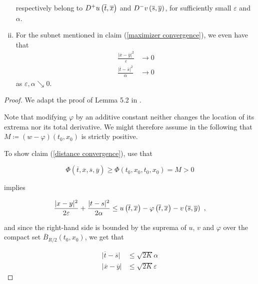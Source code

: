 \begin{lemma}
\begin{enumerate}[(i)]
		 		respectively belong to $ D^{+}u\left(\overline{t}, \overline{x}\right) $ and $ D^{-}v\left(\overline{s}, \overline{y}\right) $, for sufficiently small $ \varepsilon $ and $ \alpha $.
		 		
		 		\item
		 		\label{fast convergence}
		 		For the subnet mentioned in claim (\ref{maximizer convergence}), we even have that
		 		\begin{align*}
		 			\frac{\lvert \overline{x} - \overline{y} \rvert^2}{\varepsilon} &\to 0 \\
		 			\frac{\lvert \overline{t} - \overline{s} \rvert^2}{\alpha} &\to 0 
		 		\end{align*} 
		 		as $ \varepsilon, \alpha \searrow 0 $.
		 	\end{enumerate}
	 	
	 	\begin{proof}
	 		We adapt the proof of Lemma 5.2 in \cite[p.~69]{barles}.
	 		
	 		Note that modifying $ \varphi $ by an additive constant neither changes the location of its extrema nor its total derivative. We might therefore assume in the following that $ M \coloneqq (w - \varphi)(t_0, x_0)  $ is strictly positive.
	 		
	 		To show claim (\ref{distance convergence}), use that
	 		
	 		\begin{equation}
	 			\label{larger maximum}
	 			\Phi(\overline{t}, \overline{x}, \overline{s}, \overline{y}) \geq \Phi(t_0, x_0, t_0, x_0) = M > 0
	 		\end{equation}
	 		
	 		implies
	 		
	 		\begin{equation*}
	 			\frac{\lvert x - y \rvert^2 }{2 \varepsilon} + \frac{\lvert t - s \rvert^2}{2 \alpha} \leq u\left(\overline{t}, \overline{x}\right) - \varphi\left(\overline{t}, \overline{x}\right) - v\left(\overline{s}, \overline{y}\right) \ ,
	 		\end{equation*}
	 		
	 		and since the right-hand side is bounded by the suprema of $ u $, $ v $ and $ \varphi $ over the compact set $ \overline{B}_{R / 2}(t_0, x_0) $, we get that
	 		
	 		\begin{align*}
	 			\lvert \overline{t} - \overline{s} \rvert &\leq \sqrt{2 K} \alpha \\
	 			\lvert \overline{x} - \overline{y} \rvert &\leq \sqrt{2 K} \varepsilon
	 		\end{align*}
	 		

\end{proof}
\end{lemma}
